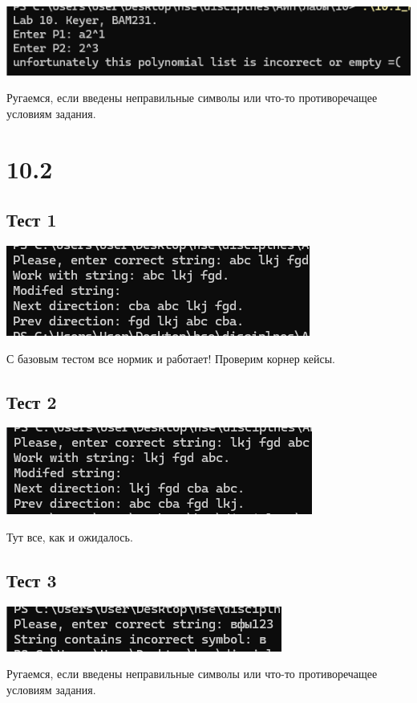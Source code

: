 \documentclass[12pt]{article}
\begin{document}
	\includegraphics[width=\linewidth]{images/test3}
	
	Ругаемся, если введены неправильные символы или что-то противоречащее условиям задания.
	
	\section{10.2}

		\subsection{Тест 1}
	
	
	\includegraphics[width=\linewidth]{images/test4}
	
	С базовым тестом все нормик и работает! Проверим корнер кейсы.
	
	
	\subsection{Тест 2}
	
	\includegraphics[width=\linewidth]{images/test5}
	
	Тут все, как и ожидалось.
	
	\subsection{Тест 3}
	
	\includegraphics[width=\linewidth]{images/test6}
	
	Ругаемся, если введены неправильные символы или что-то противоречащее условиям задания.
	
\end{document}
